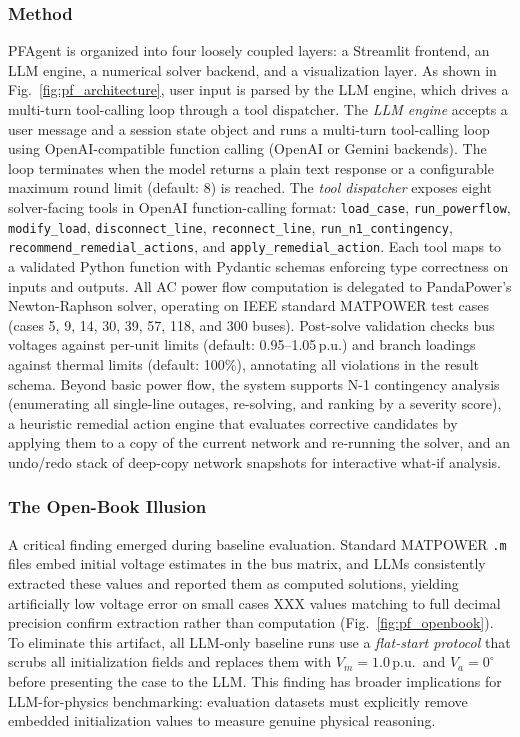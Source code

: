 \documentclass[journal,onecolumn]{IEEEtran} %
\newcommand{\todo}[1]{\color{red}#1\color{black}}
\begin{document}
  \subsubsection*{\textbf{Method}}
 PFAgent is organized into four loosely coupled layers: a Streamlit frontend, an LLM engine, a numerical solver backend, and a visualization layer. As shown in Fig.~\ref{fig:pf_architecture}, user input is parsed by the LLM engine, which drives a multi-turn tool-calling loop through a tool dispatcher.
 The \textit{LLM engine} accepts a user message and a session state object and runs a multi-turn tool-calling loop using OpenAI-compatible function calling (OpenAI or Gemini backends). The loop terminates when the model returns a plain text response or a configurable maximum round limit (default: 8) is reached.
 The \textit{tool dispatcher} exposes eight solver-facing tools in OpenAI function-calling format: \texttt{load\_case}, \texttt{run\_powerflow}, \texttt{modify\_load}, \texttt{disconnect\_line}, \texttt{reconnect\_line}, \texttt{run\_n1\_contingency}, \texttt{recommend\_remedial\_actions}, and \texttt{apply\_remedial\_action}. Each tool maps to a validated Python function with Pydantic schemas enforcing type correctness on inputs and outputs. All AC power flow computation is delegated to PandaPower's Newton-Raphson solver, operating on IEEE standard MATPOWER test cases (cases 5, 9, 14, 30, 39, 57, 118, and 300 buses). Post-solve validation checks bus voltages against per-unit limits (default: 0.95--1.05\,p.u.) and branch loadings against thermal limits (default: 100\%), annotating all violations in the result schema.
 Beyond basic power flow, the system supports N-1 contingency analysis (enumerating all single-line outages, re-solving, and ranking by a severity score), a heuristic remedial action engine that evaluates corrective candidates by applying them to a copy of the current network and re-running the solver, and an undo/redo stack of deep-copy network snapshots for interactive what-if analysis.  
 
 \subsubsection*{The Open-Book Illusion}  
 A critical finding emerged during baseline evaluation. Standard  MATPOWER \texttt{.m} files embed initial voltage estimates in the bus  matrix, and LLMs consistently extracted these values and reported  them as computed solutions, yielding artificially low voltage error on  small cases \todo{XXX} values matching to full decimal precision confirm  extraction rather than computation  (Fig.~\ref{fig:pf_openbook}). To eliminate this artifact, all  LLM-only baseline runs use a \textit{flat-start protocol} that scrubs  all initialization fields and replaces them with $V_m = 1.0$\,p.u.\  and $V_a = 0^\circ$ before presenting the case to the LLM. This  finding has broader implications for LLM-for-physics benchmarking:  evaluation datasets must explicitly remove embedded initialization  values to measure genuine physical reasoning.
\end{document}
